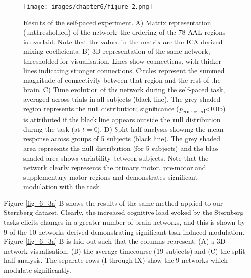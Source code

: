 \begin{figure}[h!]
	\texttt{[image: images/chapter6/figure\_2.png]}\caption{Results of the self-paced experiment. A) Matrix representation (unthresholded) of the network; the ordering of the 78 AAL regions is overlaid. Note that the values in the matrix are the ICA derived mixing coefficients. B) 3D representation of the same network, thresholded for visualisation. Lines show connections, with thicker lines indicating stronger connections. Circles represent the summed magnitude of connectivity between that region and the rest of the brain. C) Time evolution of the network during the self-paced task, averaged across trials in all subjects (black line). The grey shaded region represents the null distribution; significance (\textit{p}\textsubscript{corrected}<0.05) is attributed if the black line appears outside the null distribution during the task (at $t = 0$). D) Split-half analysis showing the mean response across groups of 5 subjects (black line). The grey shaded area represents the null distribution (for 5 subjects) and the blue shaded area shows variability between subjects. Note that the network clearly represents the primary motor, pre-motor and supplementary motor regions and demonstrates significant modulation with the task.}\label{fig_6_2}
\end{figure}

Figure \ref{fig_6_3a}-B shows the results of the same method applied to our Sternberg dataset. Clearly, the increased cognitive load evoked by the Sternberg tasks elicits changes in a greater number of brain networks, and this is shown by 9 of the 10 networks derived demonstrating significant task induced modulation. Figure \ref{fig_6_3a}-B is laid out such that the columns represent: (A) a 3D network visualisation, (B) the average timecourse (19 subjects) and (C) the split-half analysis. The separate rows (I through IX) show the 9 networks which modulate significantly.

